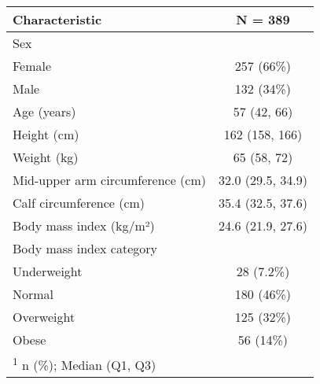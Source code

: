 
\begin{tabular}{l|c}
\hline
\textbf{Characteristic} & \textbf{N = 389}\\
\hline
Sex & \\
\hline
\hspace{1em}Female & 257 (66\%)\\
\hline
\hspace{1em}Male & 132 (34\%)\\
\hline
Age (years) & 57 (42, 66)\\
\hline
Height (cm) & 162 (158, 166)\\
\hline
Weight (kg) & 65 (58, 72)\\
\hline
Mid-upper arm circumference (cm) & 32.0 (29.5, 34.9)\\
\hline
Calf circumference (cm) & 35.4 (32.5, 37.6)\\
\hline
Body mass index (kg/m²) & 24.6 (21.9, 27.6)\\
\hline
Body mass index category & \\
\hline
\hspace{1em}Underweight & 28 (7.2\%)\\
\hline
\hspace{1em}Normal & 180 (46\%)\\
\hline
\hspace{1em}Overweight & 125 (32\%)\\
\hline
\hspace{1em}Obese & 56 (14\%)\\
\hline
\multicolumn{2}{l}{\rule{0pt}{1em}\textsuperscript{1} n (\%); Median (Q1, Q3)}\\
\end{tabular}